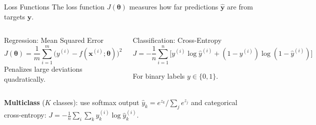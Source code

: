 \documentclass[aspectratio=169,11pt]{beamer}
\newcommand{\x}{\bm{x}}
\begin{document}
\begin{frame}{Loss Functions}
The loss function $J(\bm{\theta})$ measures how far predictions $\hat{\bm{y}}$ are from targets $\bm{y}$.

\vspace{0.4cm}
\begin{columns}[T]
\begin{block}{Regression: Mean Squared Error}
\[
    J(\bm{\theta}) = \frac{1}{m}\sum_{i=1}^{m}\big(y^{(i)} - f(\x^{(i)};\bm{\theta})\big)^{2}
\]
Penalizes large deviations quadratically.
\end{block}

\begin{block}{Classification: Cross-Entropy}
{\small
\[
    J = -\frac{1}{n}\sum_{i=1}^{n}\!\Big[y^{(i)}\!\log\hat{y}^{(i)} + (1{-}y^{(i)})\log(1{-}\hat{y}^{(i)})\Big]
\]}%
\vspace{-0.3cm}

For binary labels $y\in\{0,1\}$.
\end{block}
\end{columns}

\vspace{0.3cm}
\textbf{Multiclass} ($K$ classes): use softmax output $\hat{y}_k = e^{z_k}\big/\sum_j e^{z_j}$ and categorical cross-entropy:
$J = -\frac{1}{n}\sum_{i}\sum_{k} y_k^{(i)}\log \hat{y}_k^{(i)}$.
\end{frame}
\end{document}
